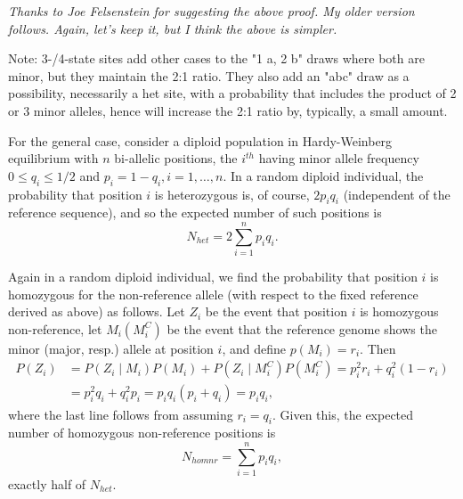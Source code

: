 \documentclass{article}\usepackage[]{graphicx}\usepackage[]{color}
\begin{document}
\ifshowalgebra
{\footnotesize 
\textit{Thanks to Joe Felsenstein for suggesting the above proof.  My older version follows.  Again, 
let's keep it, but I think the above is simpler.}

Note: 3-/4-state sites add other cases to the "1 a, 2 b" draws where both are minor, but they maintain the 2:1 ratio.  They also add an "abc" draw as a possibility, necessarily a het site, with a probability that includes the product of 2 or 3 minor alleles, hence will increase the 2:1 ratio by, typically, a small amount.

For the general case, consider a diploid population in Hardy-Weinberg
equilibrium with $n$ bi-allelic positions, the $i^{th}$ having minor
allele frequency $0 \le q_i \le 1/2$ and $p_i = 1-q_i, i=1,\ldots, n$.
In a random diploid individual, the probability that position $i$ is
heterozygous is, of course, $2 p_i q_i$ (independent of the reference
sequence), and so the expected number of such positions is
$$
  N_{het} = 2 \sum_{i=1}^n p_i q_i .
$$

Again in a random diploid individual, we find the probability that
position $i$ is homozygous for the non-reference allele (with respect
to the fixed reference derived as above) as follows.  Let $Z_i$ be the
event that position $i$ is homozygous non-reference, let $M_i (M_i^C)$ be the event
that the reference genome shows the minor (major, resp\@.) allele at
position $i$, and define $p(M_i)=r_i$.  Then
\begin{align}
  P(Z_i) & = P(Z_i \mid M_i  )P(M_i  ) 
           + P(Z_i \mid M_i^C)P(M_i^C) 
           = p_i^2 r_i + q_i^2 (1-r_i) \nonumber\\
         & = p_i^2 q_i + q_i^2 p_i = p_i q_i(p_i+q_i) = p_i q_i , \label{eq:homnr}
\end{align}
where the last line follows from assuming $r_i=q_i$.  Given this, the
expected number of homozygous non-reference positions is
$$
  N_{homnr} = \sum_{i=1}^n p_i q_i ,
$$
exactly half of $N_{het}$.
}
\fi
\iffalse
\end{document}
